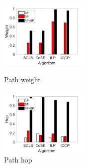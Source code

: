 \begin{figure}[tp]
\centering
\begin{minipage}[t]{0.45\linewidth}
\centering
\includegraphics[width=1.7in]{franz/weight}
\caption{Path weight}
\label{fig:normalization weitgh sum}
\end{minipage}
\hfill
\begin{minipage}[t]{0.45\linewidth}
\centering
\includegraphics[width=1.7in]{franz/hop}
\caption{Path hop}
\label{fig:normalization hop}
\end{minipage}
\end{figure}


